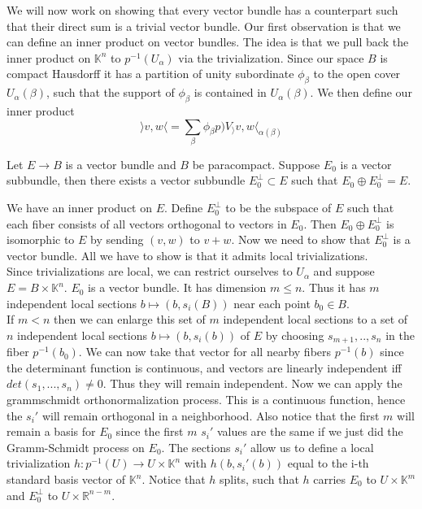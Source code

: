 \documentclass[../Thesis.tex]{subfiles}
\begin{document}
We will now work on showing that every vector bundle has a counterpart such that their direct sum is a trivial vector bundle. Our first observation is that we can define an inner product on vector bundles. The idea is that we pull back the inner product on $\mathbb{K}^n$ to $p^{-1}(U_\alpha)$ via the trivialization. Since our space $B$ is compact Hausdorff it has a partition of unity subordinate $\phi_\beta$ to the open cover $U_\alpha(\beta)$, such that  the support of $\phi_\beta$ is contained in $U_\alpha(\beta)$. We then define our inner product 
\begin{equation}
\rangle v, w \langle = \sum_\beta \phi_\beta p)V_\rangle v, w \langle_{\alpha(\beta)}
\end{equation}
\begin{lemma}
Let $E \rightarrow B$ is a vector bundle and $B$ be paracompact. Suppose $E_0$ is a vector subbundle, then there exists a vector subbundle $E_0^\perp \subset E$ such that $E_0 \oplus E_0^\perp = E$.
\end{lemma}
\begin{myproof}
We have an inner product on $E$. Define $E_0^\perp$ to be the subspace of $E$ such that each fiber consists of all vectors orthogonal to vectors in $E_0$. Then $E_0 \oplus E_0^\perp$ is isomorphic to $E$ by sending $(v,w)$ to $v + w$. Now we need to show that $E_0^\perp$ is a vector bundle. All we have to show is that it admits local trivializations.
\\Since trivializations are local, we can restrict ourselves to $U_\alpha$ and suppose $E = B \times \mathbb{K}^n$. $E_0$ is a vector bundle. It has dimension $m \leq n$. Thus it has $m$ independent local sections $b \mapsto (b, s_i(B))$ near each point $b_0 \in B$. 
\\If $m < n$ then we can enlarge this set of $m$ independent local sections to a set of $n$ independent local sections $b \mapsto (b, s_i(b))$ of $E$ by choosing $s_{m+1}, .., s_n$ in the fiber $p^{-1}(b_0)$. We can now take that vector for all nearby fibers $p^{-1}(b)$ since the determinant function is continuous, and vectors are linearly independent iff $det(s_1, ..., s_n) \neq 0$. Thus they will remain independent. Now we can apply the grammschmidt orthonormalization process. This is a continuous function, hence the $s_i'$ will remain orthogonal in a neighborhood. Also notice that the first $m$ will remain a basis for $E_0$ since the first $m$ $s_i'$ values are the same if we just did the Gramm-Schmidt process on $E_0$. The sections $s_i'$ allow us to define a local trivialization $h:p^{-1}(U) \rightarrow U \times \mathbb{K}^n$ with $h(b,s_i'(b))$ equal to the i-th standard basis vector of $\mathbb{K}^n$. Notice that $h$ splits, such that $h$ carries $E_0$ to $U \times \mathbb{K}^m$ and $E_0^\perp$ to $U \times \mathbb{R}^{n-m}$.
\end{myproof}
\end{document}
